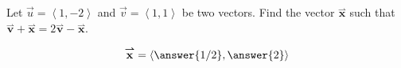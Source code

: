 \documentclass{ximera}
\author{Gregory Hartman \and Matthew Carr}
\begin{document}
\begin{exercise}
Let $\vec{u}=\left\langle 1,-2 \right\rangle$ and $\vec{v}=\left\langle 1,1 \right\rangle$ be two
vectors. Find the vector $\overset{\boldsymbol{\rightharpoonup}}{\mathbf{x}}$ such that
$\overset{\boldsymbol{\rightharpoonup}}{\mathbf{v}} + \overset{\boldsymbol{\rightharpoonup}}{\mathbf{x}} = 2 \overset{\boldsymbol{\rightharpoonup}}{\mathbf{v}} - \overset{\boldsymbol{\rightharpoonup}}{\mathbf{x}}$.
\begin{prompt}
\[
\overset{\boldsymbol{\rightharpoonup}}{\mathbf{x}} = \left\langle \answer{1/2},\answer{2} \right\rangle
\]
\end{prompt}

\end{exercise}
\end{document}
